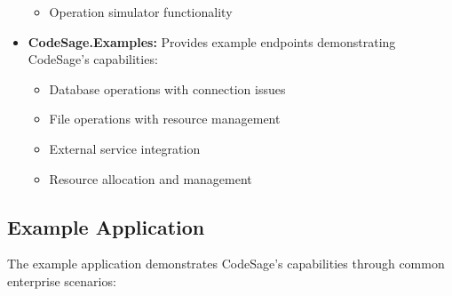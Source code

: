 \begin{itemize}
\begin{itemize}
    \item Operation simulator functionality
  \end{itemize}
\item \textbf{CodeSage.Examples:} Provides example endpoints demonstrating CodeSage's capabilities:
  \begin{itemize}
    \item Database operations with connection issues
    \item File operations with resource management
    \item External service integration
    \item Resource allocation and management
  \end{itemize}
\end{itemize}

\subsection{Example Application}
The example application demonstrates CodeSage's capabilities through common enterprise scenarios:

